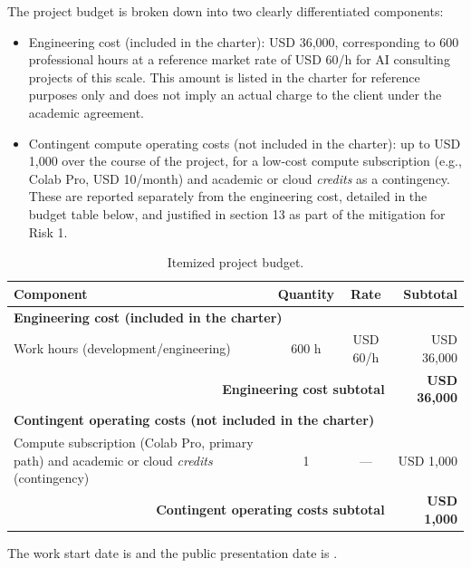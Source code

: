 \documentclass[
  11pt, %
]{charter}
\begin{document}
The project budget is broken down into two clearly differentiated components:

\begin{itemize}
  \item Engineering cost (included in the charter): USD 36,000, corresponding to 600 professional hours at a reference market rate of USD 60/h for AI consulting projects of this scale. This amount is listed in the charter for reference purposes only and does not imply an actual charge to the client under the academic agreement.
  \item Contingent compute operating costs (not included in the charter): up to USD 1,000 over the course of the project, for a low-cost compute subscription (e.g., Colab Pro, USD 10/month) and academic or cloud \textit{credits} as a contingency. These are reported separately from the engineering cost, detailed in the budget table below, and justified in section 13 as part of the mitigation for Risk 1.
\end{itemize}

\begin{table}[ht]
  \centering
  \caption{Itemized project budget.}
  \label{tab:presupuesto}
  \begin{tabularx}{\linewidth}{@{}|X|c|c|r|@{}}
    \hline
    \rowcolor[HTML]{C0C0C0}
    Component & Quantity & Rate & Subtotal \\
    \hline
    \multicolumn{4}{|l|}{\cellcolor[HTML]{EEEEEE}\textbf{Engineering cost (included in the charter)}} \\
    \hline
    Work hours (development/engineering) & 600 h & USD 60/h & USD 36,000 \\
    \hline
    \multicolumn{3}{|r|}{\textbf{Engineering cost subtotal}} & \textbf{USD 36,000} \\
    \hline
    \multicolumn{4}{|l|}{\cellcolor[HTML]{EEEEEE}\textbf{Contingent operating costs (not included in the charter)}} \\
    \hline
    Compute subscription (Colab Pro, primary path) and academic or cloud \textit{credits} (contingency) & 1 & --- & USD 1,000 \\
    \hline
    \multicolumn{3}{|r|}{\textbf{Contingent operating costs subtotal}} & \textbf{USD 1,000} \\
    \hline
  \end{tabularx}
\end{table}

The work start date is \fechaInicioName\hspace{1px} and the public presentation date is \fechaFinalName.
\end{document}
